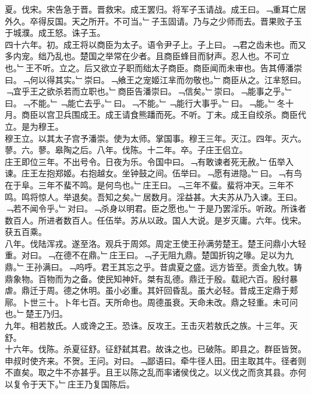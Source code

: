 \documentclass{zhvt-classic}
\begin{document}
\hspace*{2em}夏。伐宋。宋告急于晋。晋救宋。成王罢归。将军子玉请战。成王曰。﹁重耳亡居外久。卒得反国。天之所开。不可当。﹂子玉固请。乃与之少师而去。晋果败子玉于城濮。成王怒。诛子玉。\\
\hspace*{2em}四十六年。初。成王将以商臣为太子。语令尹子上。子上曰。﹁君之齿未也。而又多内宠。绌乃乱也。楚国之举常在少者。且商臣蜂目而豺声。忍人也。不可立也。﹂王不听。立之。后又欲立子职而绌太子商臣。商臣闻而未审也。告其傅潘崇曰。﹁何以得其实。﹂崇曰。﹁飨王之宠姬江芈而勿敬也。﹂商臣从之。江芈怒曰。﹁宜乎王之欲杀若而立职也。﹂商臣告潘崇曰。﹁信矣。﹂崇曰。﹁能事之乎。﹂曰。﹁不能。﹂﹁能亡去乎。﹂曰。﹁不能。﹂﹁能行大事乎。﹂曰。﹁能。﹂冬十月。商臣以宫卫兵围成王。成王请食熊蹯而死。不听。丁未。成王自绞杀。商臣代立。是为穆王。\\
\hspace*{2em}穆王立。以其太子宫予潘崇。使为太师。掌国事。穆王三年。灭江。四年。灭六。蓼。六。蓼。皋陶之后。八年。伐陈。十二年。卒。子庄王侣立。\\
\hspace*{2em}庄王即位三年。不出号令。日夜为乐。令国中曰。﹁有敢谏者死无赦。﹂伍举入谏。庄王左抱郑姬。右抱越女。坐钟鼓之间。伍举曰。﹁愿有进隐。﹂曰。﹁有鸟在于阜。三年不蜚不鸣。是何鸟也。﹂庄王曰。﹁三年不蜚。蜚将冲天。三年不鸣。鸣将惊人。举退矣。吾知之矣。﹂居数月。淫益甚。大夫苏从乃入谏。王曰。﹁若不闻令乎。﹂对曰。﹁杀身以明君。臣之愿也。﹂于是乃罢淫乐。听政。所诛者数百人。所进者数百人。任伍举。苏从以政。国人大说。是岁灭庸。六年。伐宋。获五百乘。\\
\hspace*{2em}八年。伐陆浑戎。遂至洛。观兵于周郊。周定王使王孙满劳楚王。楚王问鼎小大轻重。对曰。﹁在德不在鼎。﹂庄王曰。﹁子无阻九鼎。楚国折钩之喙。足以为九鼎。﹂王孙满曰。﹁呜呼。君王其忘之乎。昔虞夏之盛。远方皆至。贡金九牧。铸鼎象物。百物而为之备。使民知神奸。桀有乱德。鼎迁于殷。载祀六百。殷纣暴虐。鼎迁于周。德之休明。虽小必重。其奸回昏乱。虽大必轻。昔成王定鼎于郏鄏。卜世三十。卜年七百。天所命也。周德虽衰。天命未改。鼎之轻重。未可问也。﹂楚王乃归。\\
\hspace*{2em}九年。相若敖氏。人或谗之王。恐诛。反攻王。王击灭若敖氏之族。十三年。灭舒。\\
\hspace*{2em}十六年。伐陈。杀夏征舒。征舒弑其君。故诛之也。已破陈。即县之。群臣皆贺。申叔时使齐来。不贺。王问。对曰。﹁鄙语曰。牵牛径人田。田主取其牛。径者则不直矣。取之牛不亦甚乎。且王以陈之乱而率诸侯伐之。以义伐之而贪其县。亦何以复令于天下。﹂庄王乃复国陈后。\\
\end{document}
